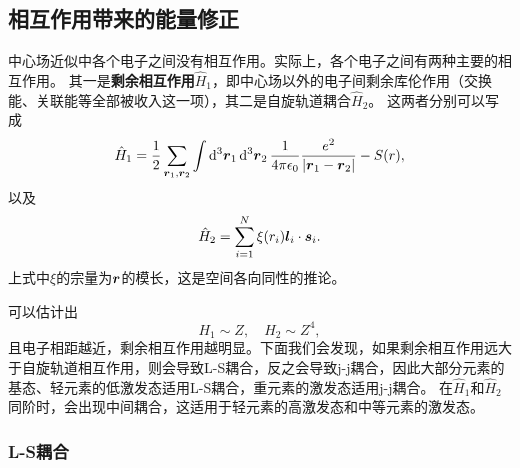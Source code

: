 \documentclass[UTF8, a4paper]{ctexart}
\begin{document}

\subsection{相互作用带来的能量修正}

中心场近似中各个电子之间没有相互作用。实际上，各个电子之间有两种主要的相互作用。
其一是\textbf{剩余相互作用}$\hat{H}_1$，即中心场以外的电子间剩余库伦作用（交换能、关联能等全部被收入这一项），其二是自旋轨道耦合$\hat{H}_2$。
这两者分别可以写成
\begin{equation}
    \hat{H}_1 = \frac{1}{2} \sum_{\vb*{r}_1, \vb*{r}_2} \int \dd[3]{\vb*{r}_1} \dd[3]{\vb*{r}_2} \frac{1}{4 \pi \epsilon_0} \frac{e^2}{\abs{\vb*{r}_1 - \vb*{r}_2}} - S(r),
\end{equation}
以及
\begin{equation}
    \hat{H}_2 = \sum_{i=1}^N \xi(r_i) \vb*{l}_i \cdot \vb*{s}_i.
    \label{eq:spin-orbital-many}
\end{equation}
上式中$\xi$的宗量为$\vb*{r}$的模长，这是空间各向同性的推论。

可以估计出
\[
    H_1 \sim Z, \quad H_2 \sim Z^4,
\]
且电子相距越近，剩余相互作用越明显。下面我们会发现，如果剩余相互作用远大于自旋轨道相互作用，则会导致L-S耦合，反之会导致j-j耦合，因此大部分元素的基态、轻元素的低激发态适用L-S耦合，重元素的激发态适用j-j耦合。
在$\hat{H}_1$和$\hat{H}_2$同阶时，会出现中间耦合，这适用于轻元素的高激发态和中等元素的激发态。

\subsubsection{L-S耦合}\label{sec:ls-coupling}

\end{document}
